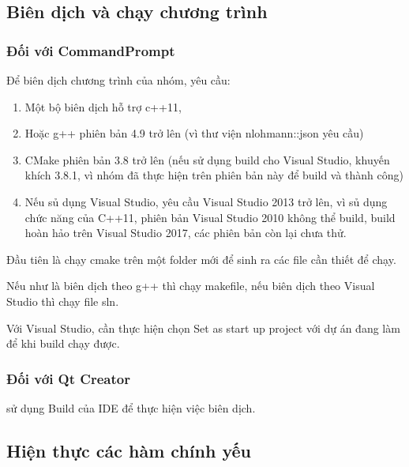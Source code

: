 \documentclass[12pt,a4paper]{report}
\begin{document}
        \subsection{Biên dịch và chạy chương trình}
        \subsubsection{Đối với CommandPrompt}
            Để biên dịch chương trình của nhóm, yêu cầu:
            \begin{enumerate}
                \item Một bộ biên dịch hỗ trợ c++11,
                \item Hoặc g++ phiên bản 4.9 trở lên (vì thư viện nlohmann::json yêu cầu)
                \item CMake phiên bản 3.8 trở lên (nếu sử dụng build cho Visual Studio, khuyến khích 3.8.1, vì nhóm đã thực hiện trên phiên bản này để build và thành công)
                \item Nếu sủ dụng Visual Studio, yêu cầu Visual Studio 2013 trở lên, vì sủ dụng chức năng của C++11, phiên bản Visual Studio 2010 không thể build, build hoàn hảo trên Visual Studio 2017, các phiên bản còn lại chưa thử.
            \end{enumerate}
            Đầu tiên là chạy cmake trên một folder mới để sinh ra các file cần thiết để chạy.\par
            Nếu như là biên dịch theo g++ thì chạy makefile, nếu biên dịch theo Visual Studio thì chạy file sln.\par
            Với Visual Studio, cần thực hiện chọn Set as start up project với dự án đang làm để khi build chạy được.\par
        \subsubsection{Đối với Qt Creator}
            sử dụng Build của IDE để thực hiện việc biên dịch.
        \newpage
        \subsection{Hiện thực các hàm chính yếu}
\end{document}
